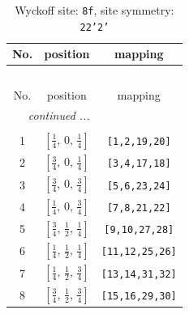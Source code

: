 \documentclass[fleqn,8pt]{jsarticle}
\begin{document}
\begin{longtable}{ccc}
\caption{Wyckoff site: {\tt 8f}, site symmetry: {\tt 22'2'}}
 \\
 \hline \hline
No. & position & mapping \\ \hline \endfirsthead

\multicolumn{2}{l}{\tablename\ \thetable{}} \\
 \hline \hline
No. & position & mapping \\ \hline \endhead

 \hline \hline
\multicolumn{2}{r}{\footnotesize\it continued ...} \\ \endfoot

 \hline \hline
\multicolumn{2}{r}{} \\ \endlastfoot

1 & $\left[ \frac{1}{4},\, 0,\, \frac{1}{4} \right]$ & {\tt [1,2,19,20]} \\ \hline
2 & $\left[ \frac{3}{4},\, 0,\, \frac{1}{4} \right]$ & {\tt [3,4,17,18]} \\ \hline
3 & $\left[ \frac{3}{4},\, 0,\, \frac{3}{4} \right]$ & {\tt [5,6,23,24]} \\ \hline
4 & $\left[ \frac{1}{4},\, 0,\, \frac{3}{4} \right]$ & {\tt [7,8,21,22]} \\ \hline
5 & $\left[ \frac{3}{4},\, \frac{1}{2},\, \frac{1}{4} \right]$ & {\tt [9,10,27,28]} \\ \hline
6 & $\left[ \frac{1}{4},\, \frac{1}{2},\, \frac{1}{4} \right]$ & {\tt [11,12,25,26]} \\ \hline
7 & $\left[ \frac{1}{4},\, \frac{1}{2},\, \frac{3}{4} \right]$ & {\tt [13,14,31,32]} \\ \hline
8 & $\left[ \frac{3}{4},\, \frac{1}{2},\, \frac{3}{4} \right]$ & {\tt [15,16,29,30]} \\
\end{longtable}
\renewcommand{\arraystretch}{1.2}
\end{document}
